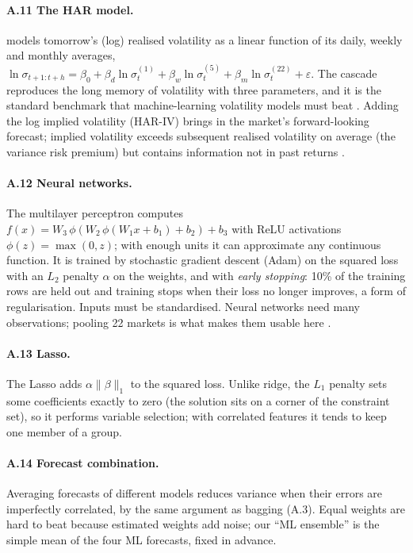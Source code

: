 \paragraph{A.11 The HAR model.} \citet{corsi2009} models tomorrow's (log) realised volatility as a linear
function of its daily, weekly and monthly averages,
$\ln\sigma_{t+1:t+h}=\beta_0+\beta_d\ln\sigma_t^{(1)}+\beta_w\ln\sigma_t^{(5)}+\beta_m\ln\sigma_t^{(22)}+\varepsilon$.
The cascade reproduces the long memory of volatility with three parameters, and it is the standard
benchmark that machine-learning volatility models must beat \citep{christensen2023}. Adding the log implied
volatility (HAR-IV) brings in the market's forward-looking forecast; implied volatility exceeds
subsequent realised volatility on average (the variance risk premium) but contains information not in past
returns \citep{bollerslev2009}.

\paragraph{A.12 Neural networks.} The multilayer perceptron computes
$f(x)=W_3\,\phi(W_2\,\phi(W_1x+b_1)+b_2)+b_3$ with ReLU activations $\phi(z)=\max(0,z)$; with enough units it
can approximate any continuous function. It is trained by stochastic gradient descent (Adam) on the squared
loss with an $L_2$ penalty $\alpha$ on the weights, and with \emph{early stopping}: 10\% of the training rows
are held out and training stops when their loss no longer improves, a form of regularisation. Inputs must be
standardised. Neural networks need many observations; pooling 22 markets is what makes them usable here
\citep{gu2020}.

\paragraph{A.13 Lasso.} The Lasso adds $\alpha\lVert\beta\rVert_1$ to the squared loss. Unlike ridge, the
$L_1$ penalty sets some coefficients exactly to zero (the solution sits on a corner of the constraint set), so
it performs variable selection; with correlated features it tends to keep one member of a group.

\paragraph{A.14 Forecast combination.} Averaging forecasts of different models reduces variance when their
errors are imperfectly correlated, by the same argument as bagging (A.3). Equal weights are hard to beat
because estimated weights add noise; our ``ML ensemble'' is the simple mean of the four ML forecasts, fixed
in advance.

